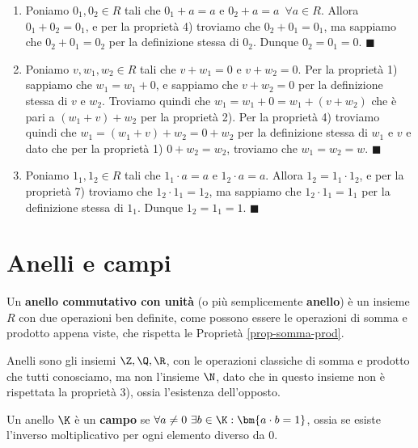 \documentclass[11pt, a4paper, titlepage, oneside]{scrbook}
\begin{document}
\begin{enumerate}
    \item Poniamo $0_1, 0_2 \in R$ tali che $0_1 + a = a$ e $0_2 + a = a \enspace \forall a \in R$. Allora $0_1 + 0_2 = 0_1$,
    e per la proprietà 4) troviamo che $0_2 + 0_1 = 0_1$, ma sappiamo che $0_2 + 0_1  = 0_2$ per la definizione stessa di $0_2$. Dunque $0_2 = 0_1 = 0$. $\blacksquare$
    \item Poniamo $v,w_1,w_2 \in R$ tali che $v + w_1 = 0$ e $v + w _2 = 0$. Per la proprietà 1) sappiamo che $w_1 = w_1 + 0$, e sappiamo che $v + w_2 = 0$ per la definizione stessa di $v$ e $w_2$. 
    Troviamo quindi che $w_1 = w_1 + 0 = w_1 + (v + w_2)$ che è pari a $(w_1 + v) + w_2$ per la proprietà 2). Per la proprietà 4) troviamo quindi che $w_1 = (w_1 + v) + w_2 = 0 + w_2$ per la definizione stessa di $w_1$ e $v$ e dato che per la proprietà 1) $0 + w_2 = w_2$, troviamo che $w_1 = w_2 = w$. $\blacksquare$
    \item Poniamo $1_1, 1_2 \in R$ tali che $1_1 \cdot a = a$ e $1_2 \cdot a = a$. Allora $1_2 = 1_1 \cdot 1_2$, 
    e per la proprietà 7) troviamo che $1_2 \cdot 1_1 = 1_2$, ma sappiamo che $1_2 \cdot 1_1 = 1_1$ per la definizione stessa di $1_1$. Dunque $1_2 = 1_1 = 1$. $\blacksquare$
\end{enumerate}

\section{Anelli e campi}

\begin{Definizione}[Anello]
\label{def-anello}
Un \textbf{anello commutativo con unità} (o più semplicemente \textbf{anello}) è un insieme $R$ con due operazioni ben definite, come possono essere le operazioni di somma e prodotto appena viste, che rispetta le Proprietà \ref{prop-somma-prod}.
\end{Definizione}

Anelli sono gli insiemi $\Z, \Q, \R$, con le operazioni classiche di somma e prodotto che tutti conosciamo, ma non l'insieme $\N$, dato che in questo insieme non è rispettata la proprietà 3), ossia l'esistenza dell'opposto.

\begin{Definizione}[Campo]
\label{def-campo}
Un anello $\K$ è un \textbf{campo} se $\forall a \neq 0 \ \exists b \in \K : \bm{a \cdot b = 1}$, ossia se esiste l'inverso moltiplicativo per ogni elemento diverso da $0$. 
\end{Definizione}
\end{document}

